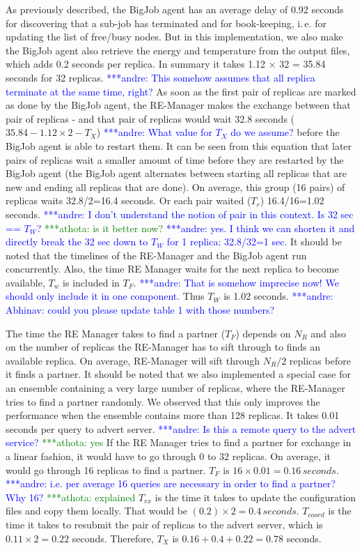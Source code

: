 \documentclass{rspublic}
\newcommand{\alnote}[1]{ {\textcolor{blue} { ***andre: #1 }}}
\newcommand{\athotanote}[1]{ {\textcolor{green} { ***athota: #1 }}}
\newcommand{\alnote}[1]{}
\newcommand{\athotanote}[1]{}
\begin{document}
As previously described, the BigJob agent has an average delay of 0.92 seconds 
for discovering that a sub-job has terminated and for book-keeping, i.\,e. for
updating the list of free/busy nodes. But in this
implementation, we also make the BigJob agent also retrieve the energy
and temperature from the output files, which adds 0.2 seconds per
replica. In summary it takes 1.12 $\times$ 32 = 35.84 seconds for 32
replicas. \alnote{This somehow assumes that all replica terminate at
the same time, right?} As soon as the first pair of replicas are marked as done by the
BigJob agent, the RE-Manager makes the exchange between that pair of replicas 
- and that pair of replicas would wait 32.8 seconds ($35.84-1.12\times2-T_X$) 
\alnote{What value for $T_{X}$ do we assume?} 
before the BigJob agent is able to restart them. It can be seen from this 
equation that later pairs of replicas wait a smaller amount of time before 
they are restarted by the BigJob agent (the BigJob agent alternates between 
starting all replicas that are new and ending all replicas that are done). 
On average, this group (16 pairs) of replicas waits  32.8/2=16.4 seconds. 
Or each pair waited ($T_r$) 16.4/16=1.02 seconds.  \alnote{I don't understand 
the notion of pair in this context. Is 32 sec == $T_W$?}\athotanote{is it better now?}\alnote{yes. I think
we can shorten it and directly break the 32 sec down to $T_W$ for 1 replica: 32.8/32=1 sec.} 
It should be noted that the timelines of the RE-Manager and the BigJob 
agent run concurrently. Also, the time RE Manager waits for the next replica to 
become available, $T_w$ is included in $T_F$.\alnote{That is somehow imprecise now! We should only
include it in one component.} 
Thus $T_W$ is 1.02 seconds. \alnote{Abhinav: could you please update table 1 with those numbers?}

The time the RE Manager takes to find a partner ($T_F$) depends on
$N_R$ and also on the number of replicas the RE-Manager has to sift
through to finds an available replica. On average, RE-Manager will
sift through $N_R/2$ replicas before it finds a partner. %
It should be noted that we also implemented a
special case for an ensemble containing a very large number of
replicas, where the RE-Manager tries to find a partner randomly. We
observed that this only improves the performance when the ensemble
contains more than 128 replicas. It takes 0.01 seconds per
query to advert server. \alnote{Is this a remote query to the advert service?} \athotanote{yes}  If the RE Manager tries to find a partner for exchange in a linear fashion, it would have to go through 0 to 32 replicas. On average, it would go through 16 replicas to find a partner. $T_F$ is $16\times
0.01=0.16\,seconds$. \alnote{i.e. per average 16 queries are necessary in
  order to find a partner? Why 16?} \athotanote{explained} $T_{ex}$ is the time it takes to
update the configuration files and copy them locally. That would be
$({0.2})\times 2=0.4\,seconds$. $T_{coord}$ is the time it takes to
resubmit the pair of replicas to the advert server, which is
$0.11\times 2 = 0.22$ seconds. Therefore, $T_{X}$ is
$0.16+0.4+0.22=0.78$ seconds. 
\end{document}
